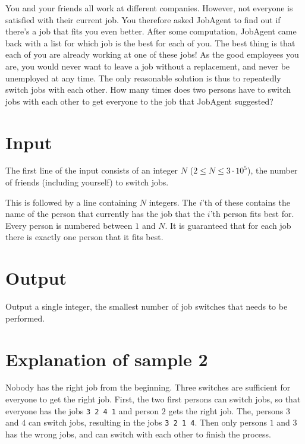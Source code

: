 You and your friends all work at different companies.
However, not everyone is satisfied with their current job.
You therefore asked JobAgent to find out if there's a job that fits you even better.
After some computation, JobAgent came back with a list for which job is the best for each of you.
The best thing is that each of you are already working at one of these jobs!
As the good employees you are, you would never want to leave a job without a replacement, and never be unemployed at any time.
The only reasonable solution is thus to repeatedly switch jobs with each other.
How many times does two persons have to switch jobs with each other to get everyone to the job that JobAgent suggested?

\section*{Input}
The first line of the input consists of an integer $N$ ($2 \le N \le 3\cdot10^5$), the number of friends (including yourself) to switch jobs.

This is followed by a line containing $N$ integers.
The $i$'th of these contains the name of the person that currently has the job that the $i$'th person fits best for.
Every person is numbered between $1$ and $N$.
It is guaranteed that for each job there is exactly one person that it fits best.

\section*{Output}
Output a single integer, the smallest number of job switches that needs to be performed.

\section*{Explanation of sample 2}
Nobody has the right job from the beginning.
Three switches are sufficient for everyone to get the right job.
First, the two first persons can switch jobs, so that everyone has the jobs \texttt{3 2 4 1} and person $2$ gets the right job.
The, persons $3$ and $4$ can switch jobs, resulting in the jobs \texttt{3 2 1 4}.
Then only persons $1$ and $3$ has the wrong jobs, and can switch with each other to finish the process.
